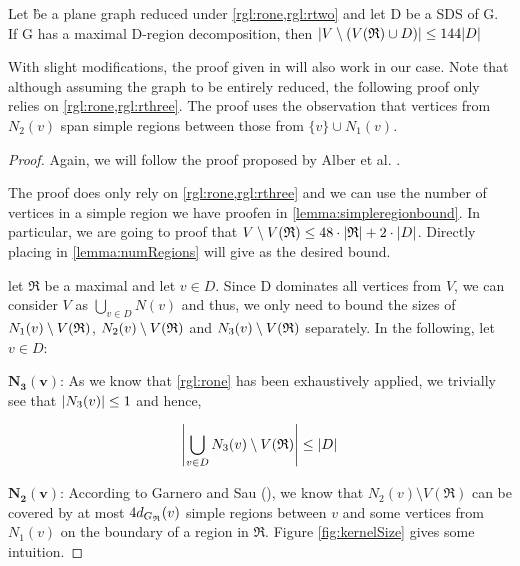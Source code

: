 \begin{proposition}\label{lemma:outside}
    Let \G be a plane graph reduced under \cref*{rgl:rone,rgl:rtwo} and let D be a SDS of G. If G has a maximal D-region decomposition, then $\abs{V \setminus (V(\mathfrak{R}) \cup D)} \leq 144 \abs{D}$
\end{proposition}

With slight modifications, the proof given in \cite{Garnero2014} will also work in our case. Note that although assuming the graph to be entirely reduced, the following proof only relies on \cref*{rgl:rone,rgl:rthree}. The proof uses the observation that vertices from $N_2(v)$ span simple regions between those from $\{v\} \cup N_1(v)$.

\begin{proof}
    Again, we will follow the proof proposed by Alber et al. \cite[Proposition 2]{Alber2004}. 
    
    The proof does only rely on \cref{rgl:rone,rgl:rthree} and we can use the number of vertices in a simple region we have proofen in \cref{lemma:simpleregionbound}. In particular, we are going to proof that $V \setminus V(\mathfrak{R}) \leq 48 \cdot \abs{\mathfrak{R}} + 2 \cdot \abs{D}$. Directly placing in \cref{lemma:numRegions} will give as the desired bound.
    
    let $\mathfrak{R}$ be a maximal \dreg and let $v \in D$. Since D dominates all vertices from $V$, we can consider $V$ as $\bigcup_{v \in D}N(v)$ and thus, we only need to bound the sizes of $N_1(v)\setminus {V(\mathfrak{R})} $, $N_2(v) \setminus {V(\mathfrak{R})} $ and $N_3(v) \setminus {V(\mathfrak{R})} $ separately. In the following, let $v \in D$:
    
    \noindent$\mathbf{N_3(v)}$: As we know that \cref{rgl:rone} has been exhaustively applied, we trivially see that $\abs{N_3(v)} \leq 1$ and hence, 
    
    \[\abs{\bigcup_{v \in D}N_3(v) \setminus V(\mathfrak{R})} \leq \abs{D}\]
    
    \noindent$\mathbf{N_2(v)}$: According to Garnero and Sau (\cite[Proposition 2]{Garnero2018}), we know that $N_2(v) \setminus V(\mathfrak{R})$ can be covered by at most $4 d_{G_{\mathfrak{R}}}(v)$ simple regions between $v$ and some vertices from $N_1(v)$ on the boundary of a region in $\mathfrak{R}$. Figure \ref{fig:kernelSize} gives some intuition.
    

\end{proof}
